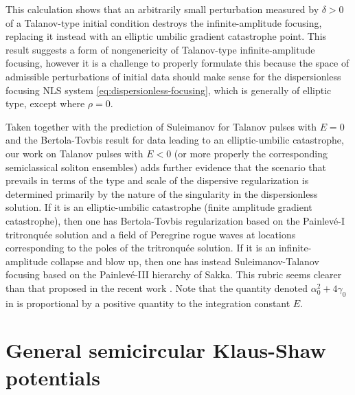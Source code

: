 \documentclass[12pt]{amsart}
\numberwithin{equation}{section}
\begin{document}
This calculation shows that an arbitrarily small perturbation measured by $\delta>0$ of a Talanov-type initial condition destroys the infinite-amplitude focusing, replacing it instead with an elliptic umbilic gradient catastrophe point.   This result suggests a form of nongenericity of Talanov-type infinite-amplitude focusing, however it is a challenge to properly formulate this because the space of admissible perturbations of initial data should make sense for the dispersionless focusing NLS system \eqref{eq:dispersionless-focusing}, which is generally of elliptic type, except where $\rho=0$.

Taken together with the prediction of Suleimanov \cite{Suleimanov17} for Talanov pulses with $E=0$ and the Bertola-Tovbis result \cite{BertolaT13} for data leading to an elliptic-umbilic catastrophe, our work on Talanov pulses with $E<0$ (or more properly the corresponding semiclassical soliton ensembles) adds further evidence that 
the scenario that prevails in terms of the type and scale of the dispersive regularization is determined primarily by the nature of the singularity in the dispersionless solution.  If it is an elliptic-umbilic catastrophe (finite amplitude gradient catastrophe), then one has Bertola-Tovbis regularization based on the Painlev\'e-I tritronqu\'ee solution and a field of Peregrine rogue waves at locations corresponding to the poles of the tritronqu\'ee solution.  If it is an infinite-amplitude collapse and blow up, then one has instead Suleimanov-Talanov focusing based on the Painlev\'e-III hierarchy of Sakka.  This rubric seems clearer than that proposed in the recent work \cite{DemontisORS23}.  Note that the quantity denoted $\alpha_0^2+4\gamma_0$ in \cite{DemontisORS23} is proportional by a positive quantity to the integration constant $E$.




\section{General semicircular Klaus-Shaw potentials}
\label{sec-gen-scKS}
\end{document}
